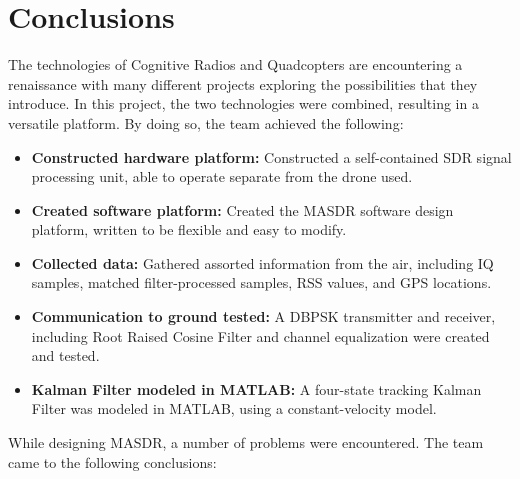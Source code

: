 \chapter{Conclusions}
The technologies of Cognitive Radios and Quadcopters are encountering a renaissance
with many different projects exploring the possibilities that they introduce. In this project,
the two technologies were combined, resulting in a versatile platform. By doing so, 
the team achieved the following:
\begin{itemize} 
 \item \textbf{Constructed hardware platform: }Constructed a self-contained SDR signal processing
                unit, able to operate separate from the drone used.
 \item \textbf{Created software platform: }Created the MASDR software design platform,
                written to be flexible and easy to modify. 
 \item \textbf{Collected data: }Gathered assorted information from the air, including 
                IQ samples, matched filter-processed samples, RSS values, and GPS locations.
 \item \textbf{Communication to ground tested: }A DBPSK transmitter and receiver, 
                including Root Raised Cosine Filter and channel equalization were created and tested. 
 \item \textbf{Kalman Filter modeled in MATLAB: }A four-state tracking Kalman Filter
                was modeled in MATLAB, using a constant-velocity model.
\end{itemize} \par
While designing MASDR, a number of problems were encountered. The team came to the following 
conclusions:
